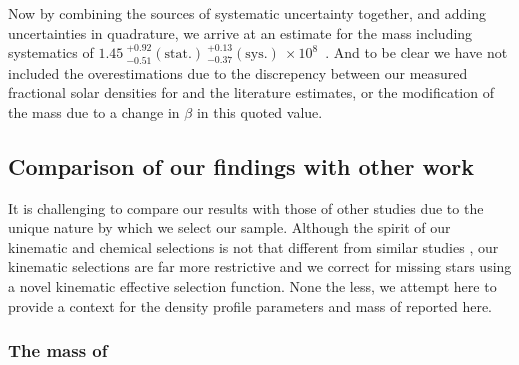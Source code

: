 Now by combining the sources of systematic uncertainty together, and adding uncertainties in quadrature, we arrive at an estimate for the mass including systematics of $1.45\ ^{+0.92}_{-0.51} \mathrm{(stat.)}\ ^{+0.13}_{-0.37} \mathrm{(sys.)}\ \times10^{8}$~\Msun. And to be clear we have not included the overestimations due to the discrepency between our measured fractional solar densities for \gse and the literature estimates, or the modification of the mass due to a change in $\beta$ in this quoted value.

\subsection{Comparison of our findings with other work}
\label{ch3:subsec:comparison-with-other-work}

It is challenging to compare our results with those of other studies due to the unique nature by which we select our sample. Although the spirit of our kinematic and chemical selections is not that different from similar studies \parencite[e.g.][]{mackereth20,han22}, our kinematic selections are far more restrictive and we correct for missing stars using a novel kinematic effective selection function. None the less, we attempt here to provide a context for the density profile parameters and mass of \gse reported here.

\subsubsection{The mass of \gse}

